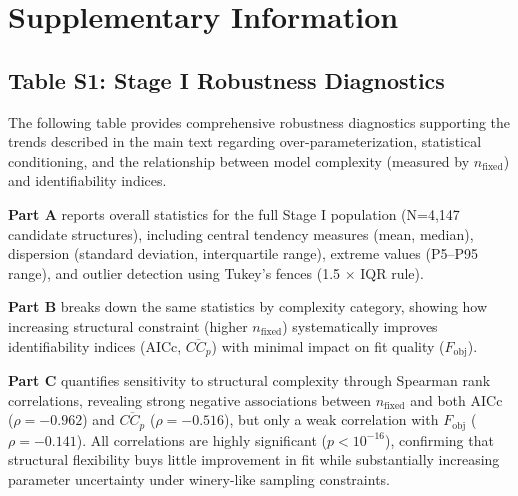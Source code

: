 \documentclass{article}
\begin{document}
\section*{Supplementary Information}


\subsection*{Table S1: Stage I Robustness Diagnostics}

The following table provides comprehensive robustness diagnostics supporting 
the trends described in the main text regarding over-parameterization, 
statistical conditioning, and the relationship between model complexity 
(measured by $n_{\mathrm{fixed}}$) and identifiability indices.

\textbf{Part A} reports overall statistics for the full Stage I population 
(N=4,147 candidate structures), including central tendency measures (mean, median), 
dispersion (standard deviation, interquartile range), extreme values 
(P5--P95 range), and outlier detection using Tukey's fences (1.5 $\times$ IQR rule).

\textbf{Part B} breaks down the same statistics by complexity category, 
showing how increasing structural constraint (higher $n_{\mathrm{fixed}}$) 
systematically improves identifiability indices (AICc, $\overline{CC_p}$) 
with minimal impact on fit quality ($F_{\mathrm{obj}}$).

\textbf{Part C} quantifies sensitivity to structural complexity through 
Spearman rank correlations, revealing strong negative associations between 
$n_{\mathrm{fixed}}$ and both AICc ($\rho=-0.962$) and $\overline{CC_p}$ 
($\rho=-0.516$), but only a weak correlation with $F_{\mathrm{obj}}$ ($\rho=-0.141$). 
All correlations are highly significant ($p<10^{-16}$), confirming that 
structural flexibility buys little improvement in fit while substantially 
increasing parameter uncertainty under winery-like sampling constraints.

\vspace{1em}

\end{document}
